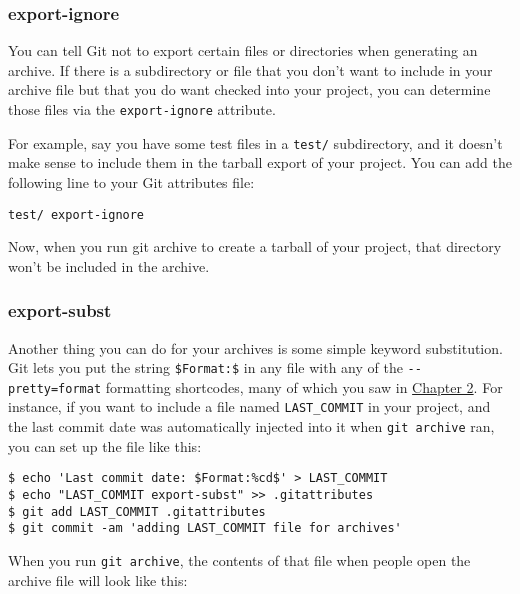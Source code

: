 \documentclass[a4paper]{book}
\newcommand{\prechap}{Chapter }
\newcommand{\postchap}{}
\newcommand{\chapref}[1]{\hyperref[chap:#1]{\prechap #1\postchap}}
\begin{document}
\subsubsection{export-ignore}

You can tell Git not to export certain files or directories when generating an archive. If there is a subdirectory or file that you don't want to include in your archive file but that you do want checked into your project, you can determine those files via the \texttt{export-ignore} attribute.

For example, say you have some test files in a \texttt{test/} subdirectory, and it doesn't make sense to include them in the tarball export of your project. You can add the following line to your Git attributes file:

\begin{shaded}\begin{verbatim}
test/ export-ignore
\end{verbatim}\end{shaded}

Now, when you run git archive to create a tarball of your project, that directory won't be included in the archive.

\subsubsection{export-subst}

Another thing you can do for your archives is some simple keyword substitution. Git lets you put the string \texttt{\$Format:\$} in any file with any of the \texttt{-{}-pretty=format} formatting shortcodes, many of which you saw in \chapref{2}. For instance, if you want to include a file named \texttt{LAST\_COMMIT} in your project, and the last commit date was automatically injected into it when \texttt{git archive} ran, you can set up the file like this:

\begin{shaded}\begin{verbatim}
$ echo 'Last commit date: $Format:%cd$' > LAST_COMMIT
$ echo "LAST_COMMIT export-subst" >> .gitattributes
$ git add LAST_COMMIT .gitattributes
$ git commit -am 'adding LAST_COMMIT file for archives'
\end{verbatim}\end{shaded}

When you run \texttt{git archive}, the contents of that file when people open the archive file will look like this:
\end{document}
